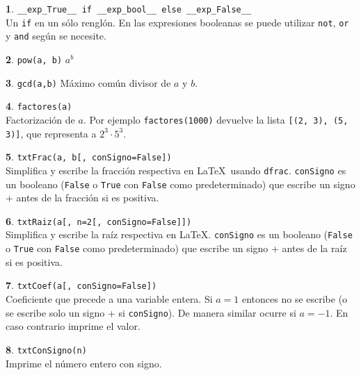 \documentclass[12pt]{article}
\theoremstyle{definition}
\newtheorem{funcion}{}[section]
\begin{document}
\begin{funcion} \verb|__exp_True__ if __exp_bool__ else __exp_False__| \\[1ex]
  Un \verb|if| en un s\'olo rengl\'on. En las expresiones booleanas se puede utilizar \verb|not|, \verb|or| y \verb|and| seg\'un se necesite.
\end{funcion}

\begin{funcion}
  \verb|pow(a, b)| \quad
  $a^b$
\end{funcion}

\begin{funcion}
  \verb|gcd(a,b)| \quad
  M\'aximo com\'un divisor de $a$ y $b$.
\end{funcion}

\begin{funcion}
  \verb|factores(a)| \\[1ex]
  Factorizaci\'on de $a$. Por ejemplo \verb|factores(1000)| devuelve la lista \verb|[(2, 3), (5, 3)]|, que representa a $2^3\cdot 5^3$.
\end{funcion}

\begin{funcion}
  \verb|txtFrac(a, b[, conSigno=False])| \\[1ex]
  Simplifica y escribe la fracci\'on respectiva en \LaTeX\ usando \verb|dfrac|. \verb|conSigno| es un booleano (\verb|False| o \verb|True| con \verb|False| como predeterminado) que escribe un signo + antes de la fracci\'on si es positiva.
\end{funcion}

\begin{funcion}
  \verb|txtRaiz(a[, n=2[, conSigno=False]])| \\[1ex]
  Simplifica y escribe la ra\'iz respectiva en \LaTeX. \verb|conSigno| es un booleano (\verb|False| o \verb|True| con \verb|False| como predeterminado) que escribe un signo + antes de la ra\'iz si es positiva.
\end{funcion}

\begin{funcion}
  \verb|txtCoef(a[, conSigno=False])| \\[1ex]
  Coeficiente que precede a una variable entera. Si $a=1$ entonces no se escribe (o se escribe solo un signo + si \verb|conSigno|). De manera similar ocurre si $a=-1$. En caso contrario imprime el valor.
\end{funcion}

\begin{funcion}
  \verb|txtConSigno(n)| \\[1ex]
  Imprime el n\'umero entero con signo.
\end{funcion}
\end{document}
